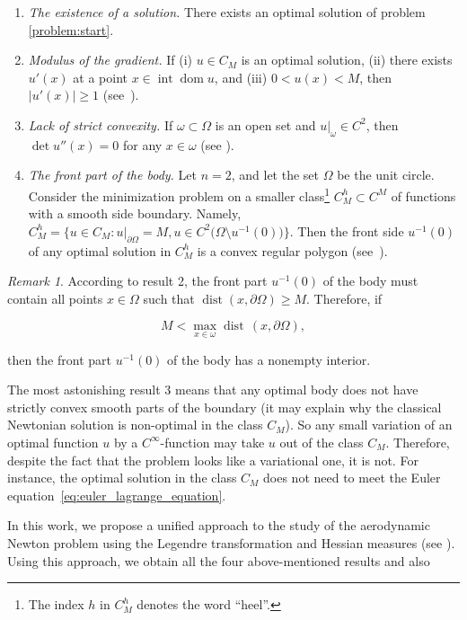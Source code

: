 \documentclass[14pt]{extarticle}
\renewcommand{\ge}{\geqslant}
\DeclareMathOperator{\dom}{\mathrm{dom}}
\DeclareMathOperator{\Int}{\mathrm{int}}
\DeclareMathOperator{\dist}{\mathrm{dist}}
\theoremstyle{remark}
\newtheorem{remark}{Remark}
\theoremstyle{definition}
\begin{document}
\begin{enumerate}
	\item \textit{The existence of a solution.} There exists an optimal solution of problem \eqref{problem:start}.
	\item \textit{Modulus of the gradient.} If (i) $u\in C_M$ is an optimal solution, (ii) there exists $u'(x)$ at a point $x\in\Int\dom u$, and (iii) $0<u(x)<M$, then $|u'(x)|\ge 1$ (see~\cite{Buttazzo1995}).
	\item \textit{Lack of strict convexity.} If $\omega\subset\Omega$ is an open set and $u|_\omega\in C^2$, then $\det u''(x)=0$ for any $x\in\omega$ (see \cite{LachandCurvature}).
	\item \textit{The front part of the body.} Let $n=2$, and let the set $\Omega$ be the unit circle. Consider the minimization problem on a smaller class\footnote{The index $h$ in $C_M^h$ denotes the word ``heel''.} $C_M^h\subset C^M$  of functions with a smooth side boundary. Namely, $C_M^h=\{u\in C_M:u|_{\partial \Omega}=M, u\in C^2\big(\Omega\setminus u^{-1}(0)\big)\}$. Then the front side $u^{-1}(0)$ of any optimal solution in $C_M^h$ is a convex regular polygon (see~\cite{LachandPolygon}).
\end{enumerate}

\begin{remark}
\label{rm:non_empty_heel}
According to result 2, the front part $u^{-1}(0)$ of the body must contain all points $x\in\Omega$ such that $\dist(x,\partial\Omega)\ge M$.
Therefore, if

	\[
		M<\max_{x\in\omega} \dist\,(x,\partial\Omega),
	\]

	\noindent then the front part $u^{-1}(0)$ of the body has a nonempty interior.	
\end{remark}

The most astonishing result 3 means that any optimal body does not have strictly convex smooth parts of the boundary (it may explain why the classical Newtonian solution is non-optimal in the class 
$C_M$). So any small variation of an optimal function $u$ by a $C^\infty$-function may take $u$ out of the class $C_M$. Therefore, despite the fact that the problem looks like a variational one, it is not.
For instance, the optimal solution in the class $C_M$ does not need to meet the Euler equation~\eqref{eq:euler_lagrange_equation}.

In this work, we propose a unified approach to the study of the aerodynamic Newton problem using the Legendre transformation and Hessian measures (see \cite{ColesantiFirst}). Using this approach, we obtain all the four above-mentioned results and also
\end{document}
